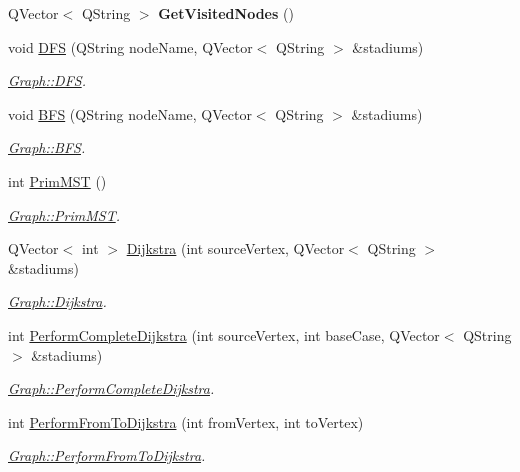 \begin{DoxyCompactItemize}
\mbox{\label{class_graph_a7bd3d4a366c25abc6ad74851e48fda8e}} 
Q\+Vector$<$ Q\+String $>$ {\bfseries Get\+Visited\+Nodes} ()
\item 
void \mbox{\hyperlink{class_graph_aa13f9b10f1dd61da066dd59901598e56}{D\+FS}} (Q\+String node\+Name, Q\+Vector$<$ Q\+String $>$ \&stadiums)
\begin{DoxyCompactList}\small\item\em \mbox{\hyperlink{class_graph_aa13f9b10f1dd61da066dd59901598e56}{Graph\+::\+D\+FS}}. \end{DoxyCompactList}\item 
void \mbox{\hyperlink{class_graph_a0e0f425a2a7a20151f1fcf537c32d7b5}{B\+FS}} (Q\+String node\+Name, Q\+Vector$<$ Q\+String $>$ \&stadiums)
\begin{DoxyCompactList}\small\item\em \mbox{\hyperlink{class_graph_a0e0f425a2a7a20151f1fcf537c32d7b5}{Graph\+::\+B\+FS}}. \end{DoxyCompactList}\item 
int \mbox{\hyperlink{class_graph_ab4b197d26dfb1a53e14f3e5197053653}{Prim\+M\+ST}} ()
\begin{DoxyCompactList}\small\item\em \mbox{\hyperlink{class_graph_ab4b197d26dfb1a53e14f3e5197053653}{Graph\+::\+Prim\+M\+ST}}. \end{DoxyCompactList}\item 
Q\+Vector$<$ int $>$ \mbox{\hyperlink{class_graph_ac4e39e620f96920a506b0d8ce9ee17f1}{Dijkstra}} (int source\+Vertex, Q\+Vector$<$ Q\+String $>$ \&stadiums)
\begin{DoxyCompactList}\small\item\em \mbox{\hyperlink{class_graph_ac4e39e620f96920a506b0d8ce9ee17f1}{Graph\+::\+Dijkstra}}. \end{DoxyCompactList}\item 
int \mbox{\hyperlink{class_graph_a3bb92a2d9cba33ba8e960eccb9c34f78}{Perform\+Complete\+Dijkstra}} (int source\+Vertex, int base\+Case, Q\+Vector$<$ Q\+String $>$ \&stadiums)
\begin{DoxyCompactList}\small\item\em \mbox{\hyperlink{class_graph_a3bb92a2d9cba33ba8e960eccb9c34f78}{Graph\+::\+Perform\+Complete\+Dijkstra}}. \end{DoxyCompactList}\item 
int \mbox{\hyperlink{class_graph_a3b0a495ac7703b4b7f12dc8e6e490f3b}{Perform\+From\+To\+Dijkstra}} (int from\+Vertex, int to\+Vertex)
\begin{DoxyCompactList}\small\item\em \mbox{\hyperlink{class_graph_a3b0a495ac7703b4b7f12dc8e6e490f3b}{Graph\+::\+Perform\+From\+To\+Dijkstra}}. \end{DoxyCompactList}\end{DoxyCompactItemize}


